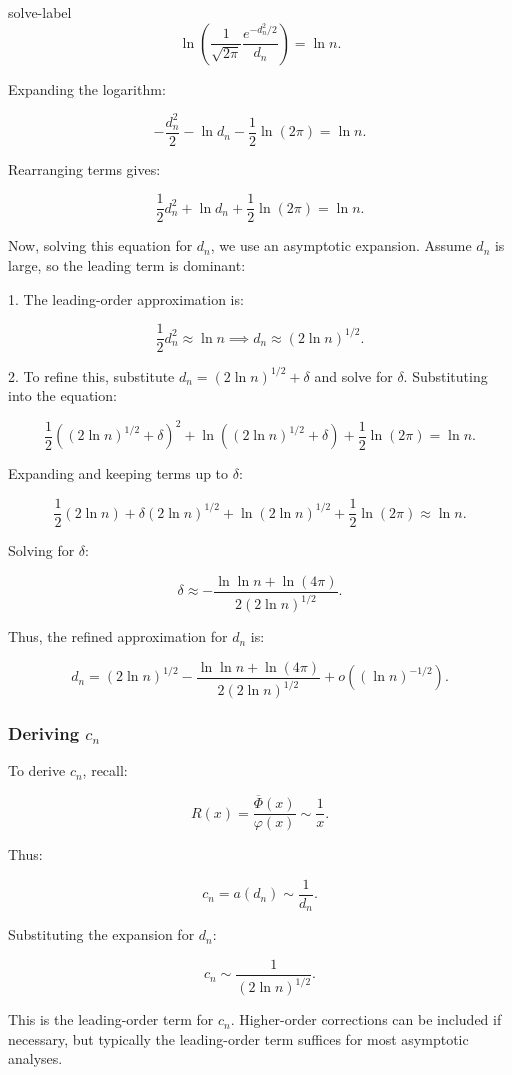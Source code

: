 \begin{solve}{}{solve-label}
\[ 
\ln \left( \frac{1}{\sqrt{2\pi}} \frac{e^{-d_n^2/2}}{d_n} \right) = \ln n. 
\]

Expanding the logarithm:

\[ 
-\frac{d_n^2}{2} - \ln d_n - \frac{1}{2}\ln(2\pi) = \ln n. 
\]

Rearranging terms gives:

\[ 
\frac{1}{2} d_n^2 + \ln d_n + \frac{1}{2} \ln(2\pi) = \ln n. 
\]

Now, solving this equation for $d_n$, we use an asymptotic expansion. Assume $d_n$ is large, so the leading term is dominant:

1. The leading-order approximation is:

\[ 
\frac{1}{2} d_n^2 \approx \ln n \implies d_n \approx (2 \ln n)^{1/2}. 
\]

2. To refine this, substitute $d_n = (2 \ln n)^{1/2} + \delta$ and solve for $\delta$. Substituting into the equation:

\[ 
\frac{1}{2} \left((2 \ln n)^{1/2} + \delta\right)^2 + \ln \left((2 \ln n)^{1/2} + \delta\right) + \frac{1}{2} \ln(2\pi) = \ln n. 
\]

Expanding and keeping terms up to $\delta$:

\[ 
\frac{1}{2} (2 \ln n) + \delta (2 \ln n)^{1/2} + \ln (2 \ln n)^{1/2} + \frac{1}{2}\ln(2\pi) \approx \ln n. 
\]

Solving for $\delta$:

\[ 
\delta \approx -\frac{\ln \ln n + \ln(4\pi)}{2(2 \ln n)^{1/2}}. 
\]

Thus, the refined approximation for $d_n$ is:

\[ 
d_n = (2 \ln n)^{1/2} - \frac{\ln \ln n + \ln(4\pi)}{2(2 \ln n)^{1/2}} + o((\ln n)^{-1/2}). 
\]

\subsubsection*{Deriving $c_n$}

To derive $c_n$, recall:

\[ 
R(x) = \frac{\overline{\Phi}(x)}{\varphi(x)} \sim \frac{1}{x}. 
\]

Thus:

\[ 
c_n = a(d_n) \sim \frac{1}{d_n}. 
\]

Substituting the expansion for $d_n$:

\[ 
c_n \sim \frac{1}{(2 \ln n)^{1/2}}. 
\]

This is the leading-order term for $c_n$. Higher-order corrections can be included if necessary, but typically the leading-order term suffices for most asymptotic analyses.


\end{solve}
